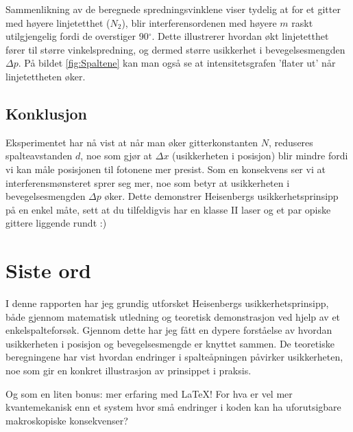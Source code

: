 \documentclass{article}
\begin{document}
Sammenlikning av de beregnede spredningsvinklene viser tydelig at for et gitter med høyere linjetetthet ($N_2$), blir interferensordenen med høyere $m$ raskt utilgjengelig fordi de overstiger 90$^\circ$. Dette illustrerer hvordan økt linjetetthet fører til større vinkelspredning, og dermed større usikkerhet i bevegelsesmengden $\Delta p$. På bildet \ref{fig:Spaltene} kan man også se at intensitetsgrafen 'flater ut' når linjetettheten øker. 


\subsection{Konklusjon}
Eksperimentet har nå vist at når man øker gitterkonstanten $N$, reduseres spalteavstanden $d$, noe som gjør at $\Delta x$ (usikkerheten i posisjon) blir mindre fordi vi kan måle posisjonen til fotonene mer presist. Som en konsekvens ser vi at interferensmønsteret sprer seg mer, noe som betyr at usikkerheten i bevegelsesmengden $\Delta p$ øker. Dette demonstrer Heisenbergs usikkerhetsprinsipp på en enkel måte, sett at du tilfeldigvis har en klasse II laser og et par opiske gittere liggende rundt :)

\vspace{0.2in}

\section{Siste ord} 
I denne rapporten har jeg grundig utforsket Heisenbergs usikkerhetsprinsipp, både gjennom matematisk utledning og teoretisk demonstrasjon ved hjelp av et enkelspalteforsøk. Gjennom dette har jeg fått en dypere forståelse av hvordan usikkerheten i posisjon og bevegelsesmengde er knyttet sammen. De teoretiske beregningene har vist hvordan endringer i spalteåpningen påvirker usikkerheten, noe som gir en konkret illustrasjon av prinsippet i praksis. 

Og som en liten bonus: mer erfaring med LaTeX! For hva er vel mer kvantemekanisk enn et system hvor små endringer i koden kan ha uforutsigbare makroskopiske konsekvenser?
\end{document}
